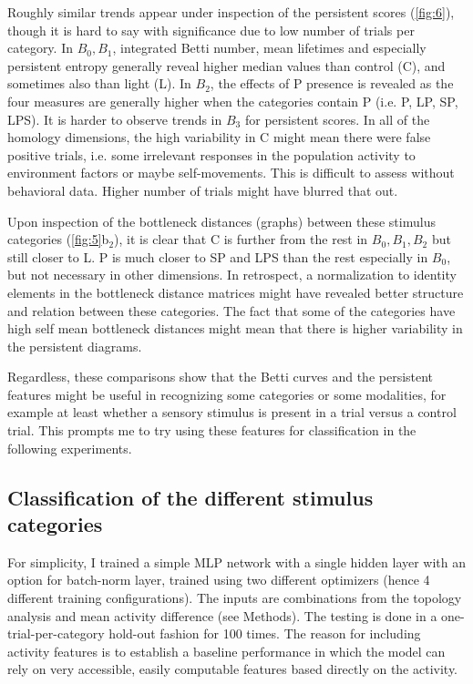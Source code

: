 

Roughly similar trends appear under inspection of the persistent scores (\autoref{fig:6}), though it is hard to say with significance due to low number of trials per category. In $B_0, B_1$, integrated Betti number, mean lifetimes and especially persistent entropy generally reveal higher median values than control (C), and sometimes also than light (L). In $B_2$, the effects of P presence is revealed as the four measures are generally higher when the categories contain P (i.e. P, LP, SP, LPS). It is harder to observe trends in $B_3$ for persistent scores. In all of the homology dimensions, the high variability in C might mean there were false positive trials, i.e. some irrelevant responses in the population activity to environment factors or maybe self-movements. This is difficult to assess without behavioral data. Higher number of trials might have blurred that out.

Upon inspection of the bottleneck distances (graphs) between these stimulus categories (\autoref{fig:5}b$_2$), it is clear that C is further from the rest in $B_0,B_1,B_2$ but still closer to L. P is much closer to SP and LPS than the rest especially in $B_0$, but not necessary in other dimensions. In retrospect, a normalization to identity elements in the bottleneck distance matrices might have revealed better structure and relation between these categories. The fact that some of the categories have high self mean bottleneck distances might mean that there is higher variability in the persistent diagrams.

Regardless, these comparisons show that the Betti curves and the persistent features might be useful in recognizing some categories or some modalities, for example at least whether a sensory stimulus is present in a trial versus a control trial. This prompts me to try using these features for classification in the following experiments.



\subsection{Classification of the different stimulus categories}

For simplicity, I trained a simple MLP network with a single hidden layer with an option for batch-norm layer, trained using two different optimizers (hence 4 different training configurations). The inputs are combinations from the topology analysis and mean activity difference (see Methods). The testing is done in a one-trial-per-category hold-out fashion for 100 times. The reason for including activity features is to establish a baseline performance in which the model can rely on very accessible, easily computable features based directly on the activity.

